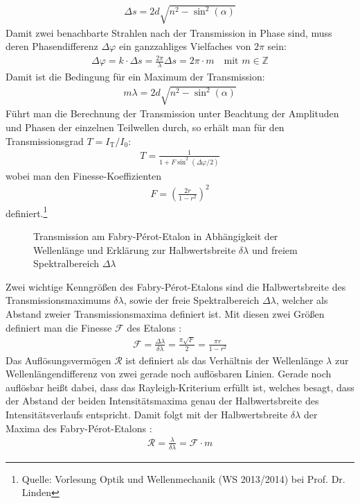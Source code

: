 \documentclass[11pt, a4paper]{article}
\begin{document}
\begin{align*}
	\Delta s = 2 d \sqrt{n^2 - \sin^2(\alpha)}
\end{align*}
Damit zwei benachbarte Strahlen nach der Transmission in Phase sind, muss deren Phasendifferenz $\Delta \varphi$ ein ganzzahliges Vielfaches von $2\pi$ sein:
\begin{align*}
	\Delta \varphi = k \cdot \Delta s = \frac{2\pi}{\lambda} \Delta s = 2 \pi \cdot m \quad \text{mit } m \in \mathbb{Z}
\end{align*}
Damit ist die Bedingung für ein Maximum der Transmission:
\begin{align}
	m \lambda = 2 d \sqrt{n^2 - \sin^2(\alpha)}
	\label{eq:interferenzbedingung}
\end{align}
Führt man die Berechnung der Transmission unter Beachtung der Amplituden und Phasen der einzelnen Teilwellen durch, so erhält man für den Transmissionsgrad $T = I_\mathrm{T} / I_0$:
\begin{align*}
	T = \frac{1}{1 + F \sin^2(\Delta \varphi / 2)}
\end{align*}
wobei man den Finesse-Koeffizienten
\begin{align*}
	F = \left( \frac{2 r}{1 - r^2} \right)^2
\end{align*}
definiert.\footnote{Quelle: Vorlesung Optik und Wellenmechanik (WS 2013/2014) bei Prof. Dr. Linden}
\begin{figure}[h]
	\centering
	\scalebox{0.9}{
	}
	\caption{Transmission am Fabry-Pérot-Etalon in Abhängigkeit der Wellenlänge und Erklärung zur Halbwertsbreite $\delta\lambda$ und freiem Spektralbereich $\Delta\lambda$}
	\label{fig:fabry_transmission}
\end{figure}
Zwei wichtige Kenngrößen des Fabry-Pérot-Etalons sind die Halbwertsbreite des Transmissionsmaximums $\delta \lambda$, sowie der freie Spektralbereich $\Delta \lambda$, welcher als Abstand zweier Transmissionsmaxima definiert ist.
Mit diesen zwei Größen definiert man die Finesse $\mathcal{F}$ des Etalons \cite{hecht}:
\begin{align}
	\mathcal{F} = \frac{\Delta \lambda}{\delta \lambda} = \frac{\pi \sqrt{F}}{2} = \frac{\pi r}{1 - r^2}
	\label{eq:finesse}
\end{align}
Das Auflösungsvermögen $\mathcal{R}$ ist definiert als das Verhältnis der Wellenlänge $\lambda$ zur Wellenlängendifferenz von zwei gerade noch auflösbaren Linien.
Gerade noch auflösbar heißt dabei, dass das Rayleigh-Kriterium erfüllt ist, welches besagt, dass der Abstand der beiden Intensitätsmaxima genau der Halbwertsbreite des Intensitätsverlaufs entspricht.
Damit folgt mit der Halbwertsbreite $\delta \lambda$ der Maxima des Fabry-Pérot-Etalons \cite{hecht}:
\begin{align}
	\mathcal{R} = \frac{\lambda}{\delta \lambda} = \mathcal{F} \cdot m
	\label{eq:aufloesung}
\end{align}
\end{document}
